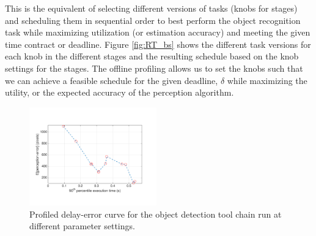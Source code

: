 
This is the equivalent of selecting different versions of tasks (knobs for stages) and scheduling them in sequential order to best perform the object recognition task while maximizing utilization (or estimation accuracy) and meeting the given time contract or deadline. Figure \ref{fig:RT_bs} shows the different task versions for each knob in the different stages and the resulting schedule based on the knob settings for the stages. The offline profiling allows us to set the knobs such that we can achieve a feasible schedule for the given deadline, $\delta$ while maximizing the utility, or the expected accuracy of the perception algorithm. 

\begin{figure}[t]
	\centering
	\includegraphics[width=0.49\textwidth]{figures/chainErrorDelay}
	\caption{Profiled delay-error curve for the object detection tool chain run at different parameter settings.}
	\label{fig:eps_delta_toy}
\end{figure}








%

